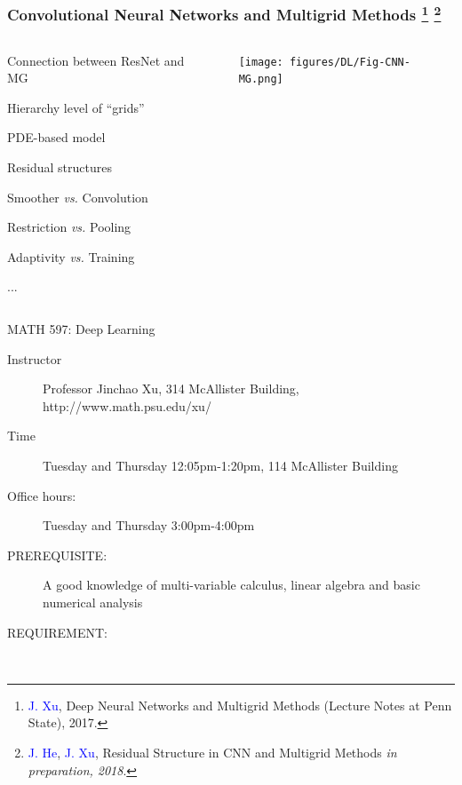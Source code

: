\documentclass{beamer}
\newcommand{\blue}[1]{\textcolor{blue}{#1}}
\begin{document}
\begin{CJK*}{UTF8}{gbsn}
\begin{frame}
\frametitle{{\small Convolutional Neural Networks and Multigrid
		Methods 
		\footnote{\blue{J. Xu}, Deep Neural Networks and Multigrid
			Methods ({L}ecture {N}otes at {P}enn {S}tate), 2017.}
		\footnote{\blue{J. He}, \blue{J. Xu}, Residual Structure in CNN and
			Multigrid Methods \textsl{in preparation, 2018}.}
} }
\begin{columns}
	\begin{column}{0.4\linewidth}
		\begin{itemize}
			\item Connection between ResNet and MG
			{\small
				\item Hierarchy level of ``grids''
				\item PDE-based model
				\item Residual structures
				\item Smoother \emph{vs.} Convolution
				\item Restriction \emph{vs.} Pooling
				\item Adaptivity \emph{vs.} Training
				\item ...
			} 
		\end{itemize}
	\end{column}
	\begin{column}{0.6\linewidth}
		\begin{figure}
			\begin{center}
				\texttt{[image: figures/DL/Fig-CNN-MG.png]}
			\end{center}
		\end{figure}
	\end{column}
\end{columns}
\end{frame}

\begin{frame}{MATH 597: Deep Learning}
\begin{description}
\item[Instructor] Professor Jinchao Xu, 314 McAllister Building, http://www.math.psu.edu/xu/
\item[Time] Tuesday and Thursday 12:05pm-1:20pm, 114 McAllister Building
\item[Office hours:] Tuesday and Thursday 3:00pm-4:00pm
\item[PREREQUISITE:]
A good knowledge of multi-variable calculus, linear
algebra and basic numerical analysis

\item[REQUIREMENT:  ]$\quad$


\end{description}
\end{frame}
\end{CJK*}
\end{document}
